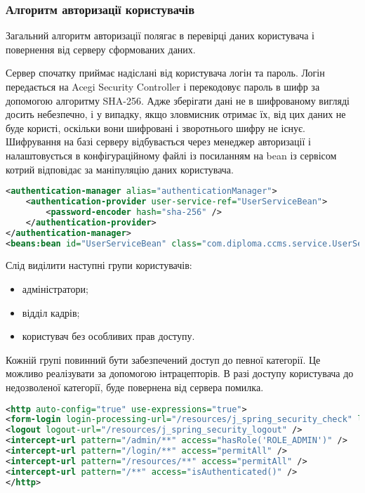 \subsubsection{Алгоритм авторизації користувачів}
Загальний алгоритм авторизації полягає в перевірці даних користувача і повернення від серверу сформованих даних.
\par Сервер спочатку приймає надіслані від користувача логін та пароль. Логін передається на Acegi Security Controller і перекодовує пароль в шифр за допомогою алгоритму SHA-256. Адже зберігати дані не в шифрованому вигляді досить небезпечно, і у випадку, якщо зловмисник отримає їх, від цих даних не буде користі, оскільки вони шифровані і зворотнього шифру не існує. Шифрування на базі серверу відбувається через менеджер авторизації і налаштовується в конфігураційному файлі із посиланням на bean із сервісом котрий відповідає за маніпуляцію даних користувача.

\begin{lstlisting}[language=Xml]
<authentication-manager alias="authenticationManager">
	<authentication-provider user-service-ref="UserServiceBean">
		<password-encoder hash="sha-256" />
	</authentication-provider>
</authentication-manager>
<beans:bean id="UserServiceBean" class="com.diploma.ccms.service.UserService" />
\end{lstlisting}

Слід виділити наступні групи користувачів:
\begin{itemize}
	\item адміністратори;
	\item відділ кадрів;
	\item користувач без особливих прав доступу.
\end{itemize}

\par Кожній групі повинний бути забезпечений доступ до певної категорії. Це можливо реалізувати за допомогою інтрацепторів. В разі доступу користувача до недозволеної категорії, буде повернена від сервера помилка.

\begin{lstlisting}[language=Xml]
<http auto-config="true" use-expressions="true">
<form-login login-processing-url="/resources/j_spring_security_check" login-page="/login" authentication-failure-url="/login?login_error=t" />
<logout logout-url="/resources/j_spring_security_logout" />
<intercept-url pattern="/admin/**" access="hasRole('ROLE_ADMIN')" />
<intercept-url pattern="/login/**" access="permitAll" />
<intercept-url pattern="/resources/**" access="permitAll" />
<intercept-url pattern="/**" access="isAuthenticated()" />
</http>
\end{lstlisting}


